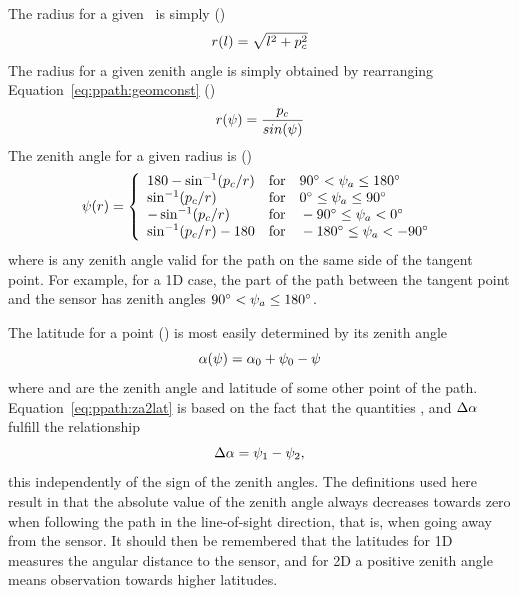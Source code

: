 The radius for a given \PpathLng\ is simply ()
\begin{equation}
  r(l) = \sqrt{l^2+p_c^2} 
  \label{eq:ppath:l2r}
\end{equation}
The radius for a given zenith angle is simply obtained by rearranging 
Equation~\ref{eq:ppath:geomconst} ()
\begin{equation}
  r(\psi) = \frac{p_c}{sin(\psi)}
  \label{eq:ppath:za2r}
\end{equation}
The zenith angle for a given radius is ()
\begin{equation}
  \psi(r) = \left\{
   \begin{array}{ll}
    180 - \sin^{-1}(p_c/r) & 
                   \textrm{for}\quad 90^\circ < \psi_{a} \leq 180^\circ\\
    \sin^{-1}(p_c/r) & 
                   \textrm{for}\quad 0^\circ \leq \psi_{a} \leq 90^\circ\\
    -\sin^{-1}(p_c/r) & 
                   \textrm{for}\quad -90^\circ \leq \psi_{a} < 0^\circ\\
    \sin^{-1}(p_c/r) - 180 & 
                  \textrm{for}\quad -180^\circ \leq \psi_{a} < -90^\circ\\
   \end{array}   \right.
  \label{eq:ppath:r2psi}
\end{equation}
where  is any zenith angle valid for the path on the same
side of the tangent point. For example, for a 1D case, the part of the
path between the tangent point and the sensor has zenith angles
$90^\circ < \psi_{a} \leq 180^\circ$.

The latitude for a point () is most 
easily determined by its zenith angle \\

\begin{equation}
  \alpha(\psi) = \alpha_{0} + \psi_{0} - \psi
  \label{eq:ppath:za2lat}
\end{equation}
where  and  are the zenith angle and latitude of some 
other point of the path. Equation~\ref{eq:ppath:za2lat} is based on the 
fact that the quantities ,  and $\Delta\alpha$
fulfill the relationship
\begin{equation}
  \Delta\alpha = \psi_{1} - \psi_{2},
  \label{eq:ppath:dlat}
\end{equation}
this independently of the sign of the zenith angles. The definitions
used here result in that the absolute value of the zenith angle always
decreases towards zero when following the path in the line-of-sight
direction, that is, when going away from the sensor. It should then be
remembered that the latitudes for 1D measures the angular distance to
the sensor, and for 2D a positive zenith angle means observation
towards higher latitudes.

